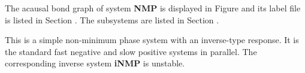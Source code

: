 

   The acausal bond graph of system \textbf{NMP} is
   displayed in Figure  and its label
   file is listed in Section .
   The subsystems are listed in Section .

This is a simple non-minimum phase system with an inverse-type
response.  It is the standard fast negative and slow positive systems
in parallel. The corresponding inverse system \textbf{iNMP} is
unstable.


